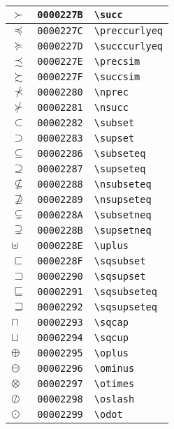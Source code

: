 \begin{longtable}{|l|l|l|}
$\succ$ & \texttt{0000227B} & \verb|\succ| \\
\hline
$\preccurlyeq$ & \texttt{0000227C} & \verb|\preccurlyeq| \\
\hline
$\succcurlyeq$ & \texttt{0000227D} & \verb|\succcurlyeq| \\
\hline
$\precsim$ & \texttt{0000227E} & \verb|\precsim| \\
\hline
$\succsim$ & \texttt{0000227F} & \verb|\succsim| \\
\hline
$\nprec$ & \texttt{00002280} & \verb|\nprec| \\
\hline
$\nsucc$ & \texttt{00002281} & \verb|\nsucc| \\
\hline
$\subset$ & \texttt{00002282} & \verb|\subset| \\
\hline
$\supset$ & \texttt{00002283} & \verb|\supset| \\
\hline
$\subseteq$ & \texttt{00002286} & \verb|\subseteq| \\
\hline
$\supseteq$ & \texttt{00002287} & \verb|\supseteq| \\
\hline
$\nsubseteq$ & \texttt{00002288} & \verb|\nsubseteq| \\
\hline
$\nsupseteq$ & \texttt{00002289} & \verb|\nsupseteq| \\
\hline
$\subsetneq$ & \texttt{0000228A} & \verb|\subsetneq| \\
\hline
$\supsetneq$ & \texttt{0000228B} & \verb|\supsetneq| \\
\hline
$\uplus$ & \texttt{0000228E} & \verb|\uplus| \\
\hline
$\sqsubset$ & \texttt{0000228F} & \verb|\sqsubset| \\
\hline
$\sqsupset$ & \texttt{00002290} & \verb|\sqsupset| \\
\hline
$\sqsubseteq$ & \texttt{00002291} & \verb|\sqsubseteq| \\
\hline
$\sqsupseteq$ & \texttt{00002292} & \verb|\sqsupseteq| \\
\hline
$\sqcap$ & \texttt{00002293} & \verb|\sqcap| \\
\hline
$\sqcup$ & \texttt{00002294} & \verb|\sqcup| \\
\hline
$\oplus$ & \texttt{00002295} & \verb|\oplus| \\
\hline
$\ominus$ & \texttt{00002296} & \verb|\ominus| \\
\hline
$\otimes$ & \texttt{00002297} & \verb|\otimes| \\
\hline
$\oslash$ & \texttt{00002298} & \verb|\oslash| \\
\hline
$\odot$ & \texttt{00002299} & \verb|\odot| \\

\end{longtable}
